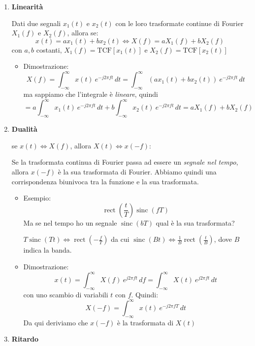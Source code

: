 \documentclass[
  paper=a4,
  ,captions=tableheading
]{scrartcl}
\providecommand{\tightlist}{%
  \setlength{\itemsep}{0pt}\setlength{\parskip}{0pt}}
\begin{document}
\begin{enumerate}
\def\labelenumi{\arabic{enumi}.}
\setcounter{enumi}{12}
\item
  \textbf{Linearità}

  Dati due segnali \(x_1(t)\) e \(x_2(t)\) con le loro trasformate
  continue di Fourier \(X_1(f)\) e \(X_2(f)\), allora se: \[
  x(t) = ax_1(t) + bx_2(t) \Longleftrightarrow X(f)=aX_1(f)+bX_2(f)
  \] con \(a,b\) costanti, \(X_1(f)=\text{TCF}[x_1(t)]\) e
  \(X_2(f)=\text{TCF}[x_2(t)]\)

  \begin{itemize}
  \tightlist
  \item
    Dimostrazione: \[
      X(f)= \int_{-\infty}^{\infty}x(t)\ e^{-j2\pi ft}\,dt = \int_{-\infty}^{\infty}(ax_1(t) + bx_2(t)) \ e^{-j2\pi ft}\,dt
      \] ma sappiamo che l'integrale è \emph{lineare}, quindi \[
      = a\int_{-\infty}^{\infty}x_1(t)\ e^{-j2\pi ft}\,dt + b\int_{-\infty}^{\infty}x_2(t)\ e^{-j2\pi ft}\,dt = aX_1(f)+bX_2(f)
      \]
  \end{itemize}
\item
  \textbf{Dualità}

  se \(x(t)\Longleftrightarrow X(f)\), allora
  \(X(t)\Longleftrightarrow x(-f)\):

  Se la trasformata continua di Fourier passa ad essere un \emph{segnale
  nel tempo}, allora \(x(-f)\) è la sua trasformata di Fourier. Abbiamo
  quindi una corrispondenza biunivoca tra la funzione e la sua
  trasformata.

  \begin{itemize}
  \item
    Esempio: \[
      \mathop{\mathrm{rect}}(\frac{t}{T})\mathop{\mathrm{sinc}}(fT)
      \] Ma se nel tempo ho un segnale \(\mathop{\mathrm{sinc}}(bT)\)
    qual è la sua trasformata?

    \(T\mathop{\mathrm{sinc}}(Tt) \Longleftrightarrow \mathop{\mathrm{rect}}({-\frac{f}{T}})\)
    da cui
    \(\mathop{\mathrm{sinc}}(Bt)\Longleftrightarrow \frac{1}{B}\mathop{\mathrm{rect}}(\frac{t}{B})\),
    dove \(B\) indica la banda.
  \item
    Dimostrazione: \[
      x(t) =\int_{-\infty}^{\infty}X(f)\ e^{j2\pi ft} \,df = \int_{-\infty}^{\infty}X(t)\ e^{j2\pi ft} \,dt 
      \] con uno scambio di variabili \(t\) con \(f\). Quindi: \[
      X(-f)=\int_{-\infty}^{\infty}x(t)\ e^{-j2\pi fT} \,dt 
      \] Da qui deriviamo che \(x(-f)\) è la trasformata di \(X(t)\)
  \end{itemize}
\item
  \textbf{Ritardo}


\end{enumerate}
\end{document}
